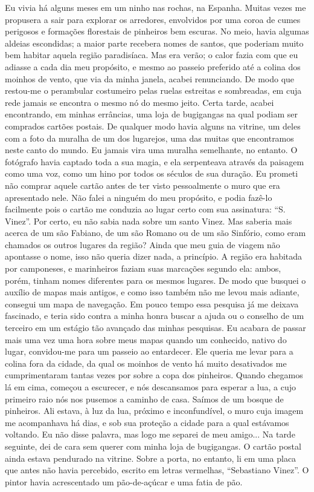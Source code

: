 Eu vivia há alguns meses em um ninho nas rochas, na Espanha. Muitas
vezes me propusera a sair para explorar os arredores, envolvidos por uma
coroa de cumes perigosos e formações florestais de pinheiros bem
escuras. No meio, havia algumas aldeias escondidas; a maior parte
recebera nomes de santos, que poderiam muito bem habitar aquela região
paradisíaca. Mas era verão; o calor fazia com que eu adiasse a cada dia
meu propósito, e mesmo ao passeio preferido até a colina dos moinhos de
vento, que via da minha janela, acabei renunciando. De modo que
restou-me o perambular costumeiro pelas ruelas estreitas e sombreadas,
em cuja rede jamais se encontra o mesmo nó do mesmo jeito. Certa tarde,
acabei encontrando, em minhas errâncias, uma loja de bugigangas na qual
podiam ser comprados cartões postais. De qualquer modo havia alguns na
vitrine, um deles com a foto da muralha de um dos lugarejos, uma das
muitas que encontramos neste canto do mundo. Eu jamais vira uma muralha
semelhante, no entanto. O fotógrafo havia captado toda a sua magia, e
ela serpenteava através da paisagem como uma voz, como um hino por todos
os séculos de sua duração. Eu prometi não comprar aquele cartão antes de
ter visto pessoalmente o muro que era apresentado nele. Não falei a
ninguém do meu propósito, e podia fazê-lo facilmente pois o cartão me
conduzia ao lugar certo com sua assinatura: ``S. Vinez''. Por certo, eu
não sabia nada sobre um santo Vinez. Mas saberia mais acerca de um são
Fabiano, de um são Romano ou de um são Sinfório, como eram chamados os
outros lugares da região? Ainda que meu guia de viagem não apontasse o
nome, isso não queria dizer nada, a princípio. A região era habitada por
camponeses, e marinheiros faziam suas marcações segundo ela: ambos,
porém, tinham nomes diferentes para os mesmos lugares. De modo que
busquei o auxílio de mapas mais antigos, e como isso também não me levou
mais adiante, consegui um mapa de navegação. Em pouco tempo essa
pesquisa já me deixava fascinado, e teria sido contra a minha honra
buscar a ajuda ou o conselho de um terceiro em um estágio tão avançado
das minhas pesquisas. Eu acabara de passar mais uma vez uma hora sobre
meus mapas quando um conhecido, nativo do lugar, convidou-me para um
passeio ao entardecer. Ele queria me levar para a colina fora da cidade,
da qual os moinhos de vento há muito desativados me cumprimentaram
tantas vezes por sobre a copa dos pinheiros. Quando chegamos lá em cima,
começou a escurecer, e nós descansamos para esperar a lua, a cujo
primeiro raio nós nos pusemos a caminho de casa. Saímos de um bosque de
pinheiros. Ali estava, à luz da lua, próximo e inconfundível, o muro
cuja imagem me acompanhava há dias, e sob sua proteção a cidade para a
qual estávamos voltando. Eu não disse palavra, mas logo me separei de
meu amigo... Na tarde seguinte, dei de cara sem querer com minha loja de
bugigangas. O cartão postal ainda estava pendurado na vitrine. Sobre a
porta, no entanto, li em uma placa que antes não havia percebido,
escrito em letras vermelhas, ``Sebastiano Vinez''. O pintor havia
acrescentado um pão-de-açúcar e uma fatia de pão.

